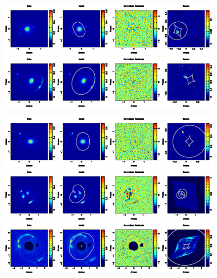 \documentclass[a4paper,fleqn,usenatbib]{mnras}
\begin{document}
 \begin{figure}
\begin{center} 
\includegraphics[width = 16 cm]{fig2a.ps}
\includegraphics[width = 16 cm]{fig2b.ps}
\contcaption{}
\end{center}     
 \end{figure}

 \begin{figure}
\begin{center} 
\includegraphics[width = 16 cm]{fig3a.ps}
\includegraphics[width = 16 cm]{fig3b.ps}
\includegraphics[width = 16 cm]{fig3c.ps}
\contcaption{}
\end{center}     
 \end{figure}
 
\end{document}
